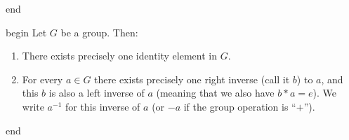 \documentclass[
  12pt,
  a4paper,
  twoside]{article}
\theoremstyle{plain}
\theoremstyle{definition}
\begin{document}
\csname end

\csname begin\label{cnj:prop-groups-enhancing-axioms}
Let \(G\) be a group. Then:

\begin{enumerate}
\def\labelenumi{(\alph{enumi})}
\item
  There exists precisely one identity element in \(G\).
\item
  For every \(a\in G\) there exists precisely one right inverse (call it \(b\)) to \(a\), and this \(b\) is also a left inverse of \(a\) (meaning that we also have \(b*a=e\)). We write \(a^{-1}\) for this inverse of \(a\) (or \(-a\) if the group operation is ``\(+\)'').
\end{enumerate}

\csname end
\end{document}
